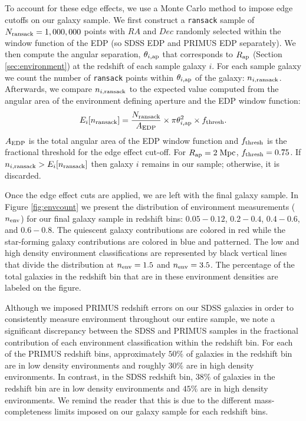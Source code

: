 \documentclass{emulateapj}
\begin{document}
To account for these edge effects, we use a Monte Carlo method to impose edge cutoffs on our galaxy sample. We first construct a \texttt{ransack} sample of  $N_{\rm{ransack}} = 1,000,000$ points with $RA$ and $Dec$ randomly selected within the window function of the EDP (so SDSS EDP and PRIMUS EDP separately). We then compute the angular separation, $\theta_{i, \rm{ap}}$ that corresponds to $R_{\rm{ap}}$ (Section \ref{sec:environment}) at the redshift of each sample galaxy $i$. For each sample galaxy we count the number of \texttt{ransack} points within $\theta_{i, \rm{ap}}$ of the galaxy: $n_{i,\rm{ransack}}$. Afterwards, we compare $n_{i,\rm{ransack}}$ to the expected value computed from the angular area of the environment defining aperture and the EDP window function: 
\begin{equation} \label{eq:ransack}
E_{i}[n_{\rm{ransack}}] = \frac{N_{\rm{ransack}}}{A_{\rm{EDP}}}\times {\pi \theta_{i, \rm{ap}}^2} \times f_{\rm{thresh}}. 
\end{equation} 
$A_{\rm{EDP}}$ is the total angular area of the EDP window function and $f_{\rm{thresh}}$ is the fractional threshold for the edge effect cut-off. For $R_{\rm{ap}}= 2\;\rm{Mpc}$, $f_{\rm{thresh}} = 0.75$. If $n_{i, \rm{ransack}} > E_{i}[n_{\rm{ransack}}]$ then galaxy $i$ remains in our sample; otherwise, it is discarded. 

Once the edge effect cuts are applied, we are left with the final galaxy sample. In Figure \ref{fig:envcount} we present the distribution of environment measurements ($n_{\rm{env}}$) for our final galaxy sample in redshift bins: $0.05 - 0.12$, $0.2 - 0.4$, $0.4-0.6$, and $0.6-0.8$. The quiescent galaxy contributions are colored in red while the star-forming galaxy contributions are colored in blue and patterned. The low and high density environment classifications are represented by black vertical lines that divide the distribution at $n_{\rm{env}} = 1.5$ and $n_{\rm{env}} = 3.5$. The percentage of the total galaxies in the redshift bin that are in these environment densities are labeled on the figure. 

Although we imposed PRIMUS redshift errors on our SDSS galaxies in order to consistently measure environment throughout our entire sample, we note a significant discrepancy between the SDSS and PRIMUS samples in the fractional contribution of each environment classification within the redshift bin. For each of the PRIMUS redshift bins, approximately $50 \%$ of galaxies in the redshift bin are in low density environments and roughly $30 \%$ are in high density environments. In contrast, in the SDSS redshift bin, $38 \%$ of galaxies in the redshift bin are in low density environments and $45 \%$ are in high density environments. We remind the reader that this is due to the different mass-completeness limits imposed on our galaxy sample for each redshift bins. 
\end{document}
